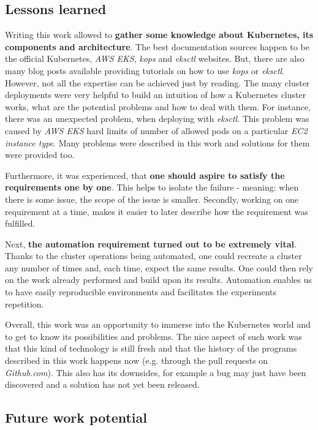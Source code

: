 \subsection{Lessons learned}

Writing this work allowed to \textbf{gather some knowledge about Kubernetes, its components and architecture}. The best documentation sources happen to be the official Kubernetes, \textit{AWS EKS}, \textit{kops} and \textit{eksctl} websites. But, there are also many blog posts available providing tutorials on how to use \textit{kops} or \textit{eksctl}. However, not all the expertise can be achieved just by reading. The many cluster deployments were very helpful to build an intuition of how a Kubernetes cluster works, what are the potential problems and how to deal with them. For instance, there was an unexpected problem, when deploying with \textit{eksctl}. This problem was caused by \textit{AWS EKS} hard limits of number of  allowed pods on a particular \textit{EC2 instance type}. Many problems were described in this work and solutions for them were provided too.

Furthermore, it was experienced, that \textbf{one should aspire to satisfy the requirements one by one}. This helps to isolate the failure - meaning: when there is some issue, the scope of the issue is smaller. Secondly, working on one requirement at a time, makes it easier to later describe how the requirement was fulfilled.

Next, \textbf{the automation requirement turned out to be extremely vital}. Thanks to the cluster operations being automated, one could recreate a cluster any number of times and, each time, expect the same results. One could then rely on the work already performed and build upon its results. Automation enables us to have easily reproducible environments and facilitates the experiments repetition.

Overall, this work was an opportunity to immerse into the Kubernetes world and to get to know its possibilities and problems. The nice aspect of such work was that this kind of technology is still fresh and that the history of the programs described in this work happens now (e.g. through the pull requests on \textit{Github.com}). This also has its downsides, for example a bug may just have been discovered and a solution has not yet been released.

\subsection{Future work potential}

